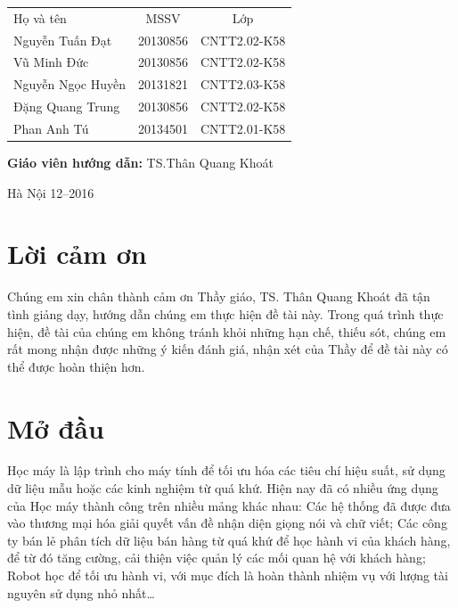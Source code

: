 \documentclass[a4paper,12pt]{report}
\renewcommand{\contentsname}{Mục lục}
\begin{document}
\begin{longtable}{l c c}

Họ và tên & MSSV  & Lớp\\
Nguyễn Tuấn Đạt & 20130856 & CNTT2.02-K58 \\
Vũ Minh Đức & 20130856 & CNTT2.02-K58 \\
Nguyễn Ngọc Huyền & 20131821 & CNTT2.03-K58 \\
Đặng Quang Trung & 20130856 & CNTT2.02-K58 \\
Phan Anh Tú & 20134501 & CNTT2.01-K58 \\

\end{longtable}

\hspace{1cm}\fontsize{14}{16}\selectfont \textbf{Giáo viên hướng dẫn: }TS.Thân Quang Khoát \\[1.5cm]
\begin{center}
\fontsize{16}{19}\selectfont Hà Nội 12--2016

\end{center}
\newpage
\pdfbookmark{\contentsname}{toc}
\tableofcontents
\chapter*{Lời cảm ơn}
Chúng em xin chân thành cảm ơn Thầy giáo, TS. Thân Quang Khoát đã tận tình giảng dạy, hướng dẫn chúng em thực hiện đề tài này. Trong quá trình thực hiện, đề tài của chúng em không tránh khỏi những hạn chế, thiếu sót, chúng em rất mong nhận được những ý kiến đánh giá, nhận xét của Thầy để đề tài này có thể được hoàn thiện hơn.
{}

\listoffigures
\chapter*{Mở đầu}
Học máy là lập trình cho máy tính để tối ưu hóa các tiêu chí hiệu suất, sử dụng dữ liệu mẫu hoặc các kinh nghiệm từ quá khứ. Hiện nay đã có nhiều ứng dụng của Học máy thành công trên nhiều mảng khác nhau: Các hệ thống đã được đưa vào thương mại hóa giải quyết vấn đề nhận diện giọng nói và chữ viết; Các công ty bán lẻ phân tích dữ liệu bán hàng từ quá khứ để học hành vi của khách hàng, để từ đó tăng cường, cải thiện việc quản lý các mối quan hệ với khách hàng; Robot học để tối ưu hành vi, với mục đích là hoàn thành nhiệm vụ với lượng tài nguyên sử dụng nhỏ nhất… \\
\end{document}
